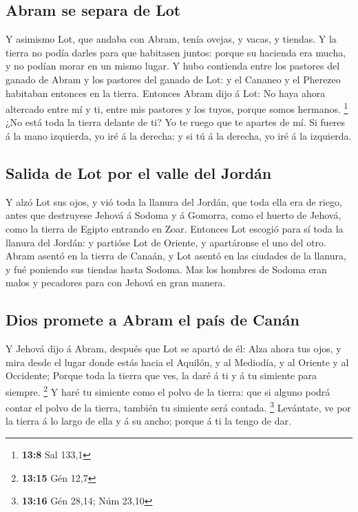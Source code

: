\hypertarget{abram-se-separa-de-lot}{%
\subsection{Abram se separa de Lot}\label{abram-se-separa-de-lot}}

 Y asimismo Lot, que andaba con Abram, tenía ovejas, y
vacas, y tiendas.  Y la tierra no podía darles para que
habitasen juntos: porque su hacienda era mucha, y no podían morar en un
mismo lugar.  Y hubo contienda entre los pastores del
ganado de Abram y los pastores del ganado de Lot: y el Cananeo y el
Pherezeo habitaban entonces en la tierra.  Entonces Abram
dijo á Lot: No haya ahora altercado entre mí y ti, entre mis pastores y
los tuyos, porque somos hermanos. \footnote{\textbf{13:8} Sal 133,1}
 ¿No está toda la tierra delante de ti? Yo te ruego que te
apartes de mí. Si fueres á la mano izquierda, yo iré á la derecha: y si
tú á la derecha, yo iré á la izquierda.

\hypertarget{salida-de-lot-por-el-valle-del-jorduxe1n}{%
\subsection{Salida de Lot por el valle del
Jordán}\label{salida-de-lot-por-el-valle-del-jorduxe1n}}

 Y alzó Lot sus ojos, y vió toda la llanura del Jordán,
que toda ella era de riego, antes que destruyese Jehová á Sodoma y á
Gomorra, como el huerto de Jehová, como la tierra de Egipto entrando en
Zoar.  Entonces Lot escogió para sí toda la llanura del
Jordán: y partióse Lot de Oriente, y apartáronse el uno del otro.
 Abram asentó en la tierra de Canaán, y Lot asentó en las
ciudades de la llanura, y fué poniendo sus tiendas hasta Sodoma.
 Mas los hombres de Sodoma eran malos y pecadores para
con Jehová en gran manera.

\hypertarget{dios-promete-a-abram-el-pauxeds-de-canuxe1n}{%
\subsection{Dios promete a Abram el país de
Canán}\label{dios-promete-a-abram-el-pauxeds-de-canuxe1n}}

 Y Jehová dijo á Abram, después que Lot se apartó de él:
Alza ahora tus ojos, y mira desde el lugar donde estás hacia el Aquilón,
y al Mediodía, y al Oriente y al Occidente;  Porque toda
la tierra que ves, la daré á ti y á tu simiente para siempre.
\footnote{\textbf{13:15} Gén 12,7}  Y haré tu simiente
como el polvo de la tierra: que si alguno podrá contar el polvo de la
tierra, también tu simiente será contada. \footnote{\textbf{13:16} Gén
  28,14; Núm 23,10}  Levántate, ve por la tierra á lo
largo de ella y á su ancho; porque á ti la tengo de dar.

